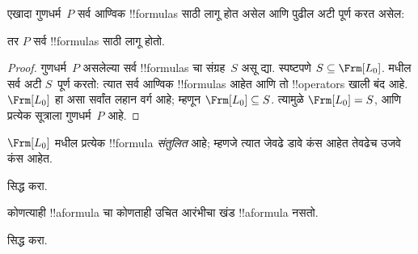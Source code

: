 \documentclass[../../../include/open-logic-section]{subfiles}
\begin{document}


\begin{thm}
  एखादा गुणधर्म~$P$ सर्व आण्विक !!{formula}s साठी लागू होत असेल आणि
  पुढील अटी पूर्ण करत असेल:
  \begin{enumerate}
  \end{enumerate}
  तर $P$ सर्व !!{formula}s साठी लागू होतो.
\end{thm}

\begin{proof}
  गुणधर्म~$P$ असलेल्या सर्व !!{formula}s चा संग्रह~$S$ असू द्या.
  स्पष्टपणे $S \subseteq \Frm[L_0]$.  मधील
  सर्व अटी $S$~पूर्ण करतो: त्यात सर्व आण्विक !!{formula}s आहेत आणि
  तो !!{operator}s खाली बंद आहे.  $\Frm[L_0]$ हा असा सर्वांत लहान
  वर्ग आहे; म्हणून $\Frm[L_0] \subseteq S$. त्यामुळे $\Frm[L_0] = S$,
  आणि प्रत्येक सूत्राला गुणधर्म~$P$ आहे.
\end{proof}

\begin{prop}
   $\Frm[L_0]$ मधील प्रत्येक !!{formula} \emph{संतुलित} आहे; म्हणजे
   त्यात जेवढे डावे कंस आहेत तेवढेच उजवे कंस आहेत.
\end{prop}

\begin{prob}
 सिद्ध करा.
\end{prob}

\begin{prop} 
कोणत्याही !!a{formula} चा कोणताही उचित आरंभीचा खंड !!a{formula} नसतो.
\end{prop}

\begin{prob}
   सिद्ध करा.
\end{prob}
\end{document}
